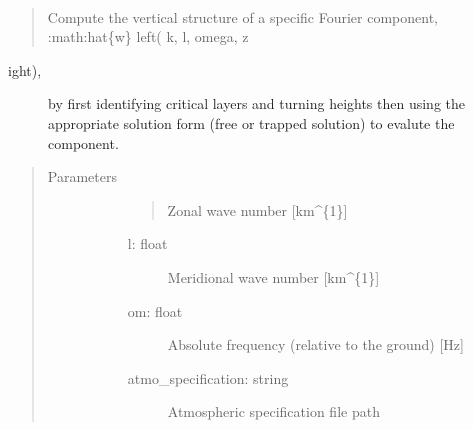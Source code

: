 \documentclass[letterpaper,10pt,english]{sphinxmanual}
\begin{document}
\begin{fulllineitems}
\label{\detokenize{stochprop.gravity:stochprop.gravity_waves.single_fourier_component}}~\begin{quote}

\sphinxAtStartPar
Compute the vertical structure of a specific Fourier component, :math:{\color{red}\bfseries{}\textasciigrave{}}hat\{w\} left( k, l, omega, z
\end{quote}
\begin{description}
\item[{ight), }] \leavevmode
\sphinxAtStartPar
by first identifying critical layers and turning heights then using the appropriate solution form (free or 
trapped solution) to evalute the component.

\end{description}
\begin{quote}\begin{description}
\item[{Parameters}] \leavevmode\begin{description}
\item[{}] \leavevmode\begin{quote}

\sphinxAtStartPar
Zonal wave number {[}km\textasciicircum{}\{\sphinxhyphen{}1\}{]}
\end{quote}
\begin{description}
\item[{l: float}] \leavevmode
\sphinxAtStartPar
Meridional wave number {[}km\textasciicircum{}\{\sphinxhyphen{}1\}{]}

\item[{om: float}] \leavevmode
\sphinxAtStartPar
Absolute frequency (relative to the ground) {[}Hz{]}

\item[{atmo\_specification: string}] \leavevmode
\sphinxAtStartPar
Atmospheric specification file path


\end{description}
\end{description}
\end{description}
\end{quote}
\end{fulllineitems}
\end{document}
